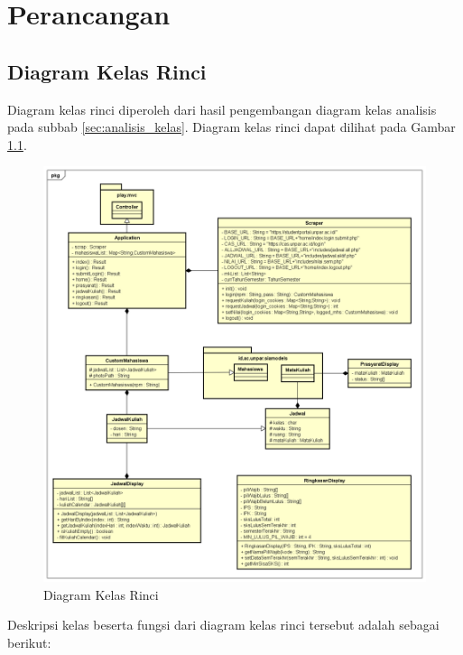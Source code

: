 \chapter{Perancangan}
\label{chap:perancangan}

\section{Diagram Kelas Rinci} 
\label{sec:diagram_kelas_rinci}
Diagram kelas rinci diperoleh dari hasil pengembangan diagram kelas analisis pada subbab \ref{sec:analisis_kelas}. Diagram kelas rinci dapat dilihat pada Gambar \ref{fig:4_final_class_diagram}. 
	\begin{figure}[ht]
			\centering
			\includegraphics[scale=0.45]{Gambar/class-diagram-final}
			\caption{Diagram Kelas Rinci} 
			\label{fig:4_final_class_diagram}
		\end{figure}
	Deskripsi kelas beserta fungsi dari diagram kelas rinci tersebut adalah sebagai berikut:
